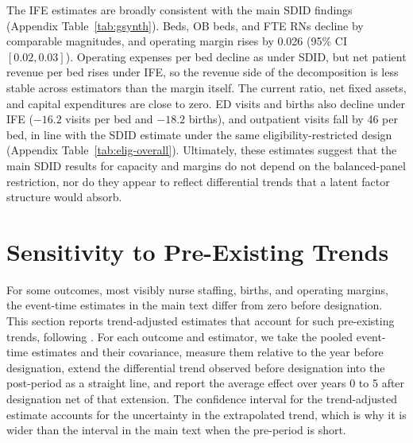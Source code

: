 \documentclass[a4paper, 12pt]{article}
\begin{document}
The IFE estimates are broadly consistent with the main SDID findings (Appendix Table~\ref{tab:gsynth}). Beds, OB beds, and FTE RNs decline by comparable magnitudes, and operating margin rises by 0.026 (95\% CI $[0.02, 0.03]$). Operating expenses per bed decline as under SDID, but net patient revenue per bed rises under IFE, so the revenue side of the decomposition is less stable across estimators than the margin itself. The current ratio, net fixed assets, and capital expenditures are close to zero. ED visits and births also decline under IFE ($-16.2$ visits per bed and $-18.2$ births), and outpatient visits fall by 46 per bed, in line with the SDID estimate under the same eligibility-restricted design (Appendix Table~\ref{tab:elig-overall}). Ultimately, these estimates suggest that the main SDID results for capacity and margins do not depend on the balanced-panel restriction, nor do they appear to reflect differential trends that a latent factor structure would absorb.

\section{Sensitivity to Pre-Existing Trends}
\label{sec:app-pretrend}

For some outcomes, most visibly nurse staffing, births, and operating margins, the event-time estimates in the main text differ from zero before designation. This section reports trend-adjusted estimates that account for such pre-existing trends, following \citet{rambachan2023}. For each outcome and estimator, we take the pooled event-time estimates and their covariance, measure them relative to the year before designation, extend the differential trend observed before designation into the post-period as a straight line, and report the average effect over years 0 to 5 after designation net of that extension. The confidence interval for the trend-adjusted estimate accounts for the uncertainty in the extrapolated trend, which is why it is wider than the interval in the main text when the pre-period is short.
\end{document}
